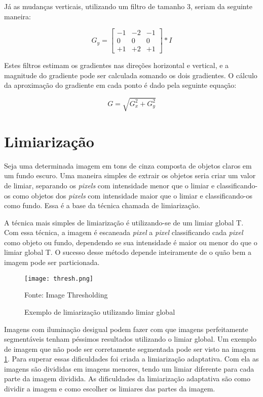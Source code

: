 Já as mudanças verticais, utilizando um filtro de tamanho 3, seriam da seguinte maneira:

\begin{displaymath}
G_{y} = \begin{bmatrix}
-1 & -2 & -1  \\
0 & 0 & 0  \\
+1 & +2 & +1
\end{bmatrix} * I
\end{displaymath}

Estes filtros estimam os gradientes nas direções horizontal e vertical, e a magnitude do gradiente pode ser calculada somando os dois gradientes. O cálculo da aproximação do gradiente em cada ponto é dado pela seguinte equação:

\begin{displaymath}
G = \sqrt{ G_{x}^{2} + G_{y}^{2} }
\end{displaymath}

\section{Limiarização}
\label{sec:limiarizacao}

Seja uma determinada imagem em tons de cinza composta de objetos claros em um fundo escuro. Uma maneira simples de extrair os objetos seria criar um valor de limiar, separando os \emph{pixels} com intensidade menor que o limiar e classificando-os como objetos dos \emph{pixels} com intensidade maior que o limiar e classificando-os como fundo. Essa é a base da técnica chamada de limiarização.\cite{gonzalez1977digital}

A técnica mais simples de limiarização é utilizando-se de um limiar global T. Com essa técnica, a imagem é escaneada \emph{pixel} a \emph{pixel} classificando cada \emph{pixel} como objeto ou fundo, dependendo se sua intensidade é maior ou menor do que o limiar global T. O sucesso desse método depende inteiramente de o quão bem a imagem pode ser particionada.\cite{gonzalez1977digital}

\begin{figure}[H]
	\centering
	\texttt{[image: thresh.png]}
	\caption{Exemplo de limiarização utilizando limiar global}
Fonte: Image Thresholding~\cite{opencv2014thresh}
	\label{fig:threshholding}
\end{figure}

Imagens com iluminação desigual podem fazer com que imagens perfeitamente segmentáveis tenham péssimos resultados utilizando o limiar global. Um exemplo de imagem que não pode ser corretamente segmentada pode ser visto na imagem \ref{fig:threshholding}. Para superar essas dificuldades foi criada a limiarização adaptativa. Com ela as imagens são divididas em imagens menores, tendo um limiar diferente para cada parte da imagem dividida. As dificuldades da limiarização adaptativa são como dividir a imagem e como escolher os limiares das partes da imagem.\cite{gonzalez1977digital}

